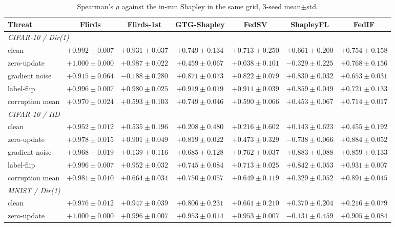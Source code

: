 \documentclass[letterpaper]{article} %
\theoremstyle{plain}
\begin{document}
\begin{table}[t]
\centering
\small
\setlength{\tabcolsep}{3pt}
\caption{Spearman's $\rho$ against the in-run Shapley in the same grid,
3-seed mean$\pm$std.}
\label{tab:grid-inrun}
\begin{tabular}{lcccccc}
\hline
Threat & Flirds & Flirds-1st & GTG-Shapley & FedSV & ShapleyFL & FedIF \\
\hline
\multicolumn{7}{l}{\emph{CIFAR-10 / Dir(1)}} \\
clean & $+0.992\pm0.007$ & $+0.931\pm0.037$ & $+0.749\pm0.134$ & $+0.713\pm0.250$ & $+0.661\pm0.200$ & $+0.754\pm0.158$ \\
zero-update & $+1.000\pm0.000$ & $+0.987\pm0.022$ & $+0.459\pm0.067$ & $+0.038\pm0.101$ & $-0.329\pm0.225$ & $+0.768\pm0.156$ \\
gradient noise & $+0.915\pm0.064$ & $-0.188\pm0.280$ & $+0.871\pm0.073$ & $+0.822\pm0.079$ & $+0.830\pm0.032$ & $+0.653\pm0.031$ \\
label-flip & $+0.996\pm0.007$ & $+0.980\pm0.025$ & $+0.919\pm0.019$ & $+0.911\pm0.039$ & $+0.859\pm0.049$ & $+0.721\pm0.133$ \\
corruption mean & $+0.970\pm0.024$ & $+0.593\pm0.103$ & $+0.749\pm0.046$ & $+0.590\pm0.066$ & $+0.453\pm0.067$ & $+0.714\pm0.017$ \\
\hline
\multicolumn{7}{l}{\emph{CIFAR-10 / IID}} \\
clean & $+0.952\pm0.012$ & $+0.535\pm0.196$ & $+0.208\pm0.480$ & $+0.216\pm0.602$ & $+0.143\pm0.623$ & $+0.455\pm0.192$ \\
zero-update & $+0.978\pm0.015$ & $+0.901\pm0.049$ & $+0.819\pm0.022$ & $+0.473\pm0.329$ & $-0.738\pm0.066$ & $+0.884\pm0.052$ \\
gradient noise & $+0.968\pm0.019$ & $+0.139\pm0.116$ & $+0.685\pm0.128$ & $+0.762\pm0.037$ & $+0.883\pm0.088$ & $+0.859\pm0.133$ \\
label-flip & $+0.996\pm0.007$ & $+0.952\pm0.032$ & $+0.745\pm0.084$ & $+0.713\pm0.025$ & $+0.842\pm0.053$ & $+0.931\pm0.007$ \\
corruption mean & $+0.981\pm0.010$ & $+0.664\pm0.034$ & $+0.750\pm0.057$ & $+0.649\pm0.119$ & $+0.329\pm0.052$ & $+0.891\pm0.045$ \\
\hline
\multicolumn{7}{l}{\emph{MNIST / Dir(1)}} \\
clean & $+0.976\pm0.012$ & $+0.947\pm0.039$ & $+0.806\pm0.231$ & $+0.661\pm0.210$ & $+0.370\pm0.204$ & $+0.216\pm0.079$ \\
zero-update & $+1.000\pm0.000$ & $+0.996\pm0.007$ & $+0.953\pm0.014$ & $+0.953\pm0.007$ & $-0.131\pm0.459$ & $+0.905\pm0.084$ \\

\end{tabular}
\end{table}
\end{document}
